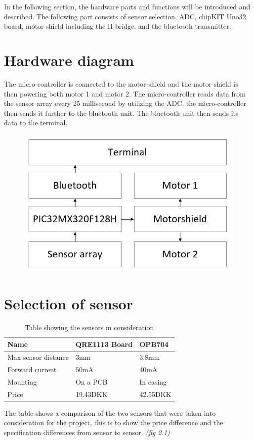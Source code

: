 In the following section, the hardware parts and functions will be introduced and described. The following part consists of sensor selection, ADC, chipKIT Uno32 board, motor-shield including the H bridge, and the bluetooth transmitter.

\section{Hardware diagram}
The micro-controller is connected to the motor-shield and the motor-shield is then powering both motor 1 and motor 2. The micro-controller reads data from the sensor array every 25 millisecond by utilizing the ADC, the micro-controller then sends it further to the bluetooth unit. The bluetooth unit then sends its data to the terminal. 
\begin{figure}[!ht]
	\centering
	\includegraphics[width=.6\textwidth]{figures/hardwaredia.png}
	\caption{}
	\label{Hardware diagram}
\end{figure}
    
\section{Selection of sensor}
\begin{table}[]
	\centering
	\label{Sensor table}
	\begin{tabular}{|l|l|l|}
		\hline
		Name                & QRE1113 Board & OPB704    \\ \hline
		Max sensor distance & 3mm           & 3.8mm     \\ \hline
		Forward current     & 50mA          & 40mA      \\ \hline
		Mounting            & On a PCB      & In casing \\ \hline
		Price               & 19.43DKK      & 42.55DKK  \\ \hline
	\end{tabular}
	\caption{Table showing the sensors in consideration}
\end{table}
The table shows a comparison of the two sensors that were taken into consideration for the project, this is to show the price difference and the specification differences from sensor to sensor. \emph{(fig 2.1)}

